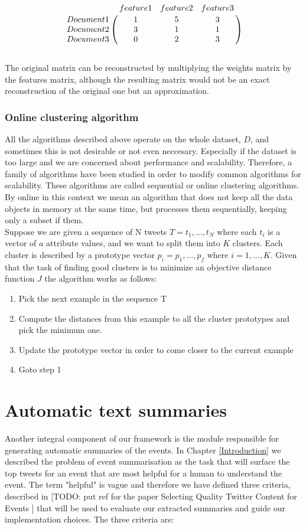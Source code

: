 \[
\bordermatrix{~ & feature 1 & feature 2 & feature 3\cr
                  Document 1 & 1 & 5 & 3\cr
                  Document 2 & 3 & 1 & 1\cr
                  Document 3 & 0 & 2 & 3\cr}
\] \\
The original matrix can be reconstructed by multiplying the weights matrix by the features matrix, although the resulting matrix would not be an exact reconstruction of the original one but an approximation. 

\subsubsection{Online clustering algorithm}
All the algorithms described above operate on the whole dataset, $D$, and sometimes this is not desirable or not even neccesary. Especially if the dataset is too large and we are concerned about performance and scalability. Therefore, a family of algorithms have been studied in order to modify common algorithms for scalability. These algorithms are called sequential or online clustering algorithms. By online in this context we mean an algorithm that does not keep all the data objects in memory at the same time, but processes them sequentially, keeping only a subset if them.\\
Suppose we are given a sequence of N tweets $T = {t_1, ..., t_N}$ where each $t_i$ is a vector of $a$ attribute values, and we want to split them into $K$ clusters. Each cluster is described by a prototype vector $p_i = {p_1, ..., p_f}$ where $i = 1, ..., K$. Given that the task of finding good clusters is to minimize an objective distance function $J$ the algorithm works as follows:
\begin{enumerate}
   \item Pick the next example in the sequence T
   \item Compute the distances from this example to all the cluster prototypes and pick the minimum one.
   \item Update the prototype vector in order to come closer to the current example  
   \item Goto step 1  
 \end{enumerate} 

\section{Automatic text summaries}\label{SummaryGen}

Another integral component of our framework is the module responsible for generating automatic summaries of the events. In Chapter \ref{Introduction}
we described the problem of event summarisation as the task that will surface the top tweets for an event that are most helpful for a human to understand the event.
The term "helpful" is vague and therefore we have defined three criteria, described in [TODO: put ref for the paper Selecting Quality Twitter Content for Events ] that will be used to evaluate our extracted summaries and guide our implementation choices. The three criteria are:


